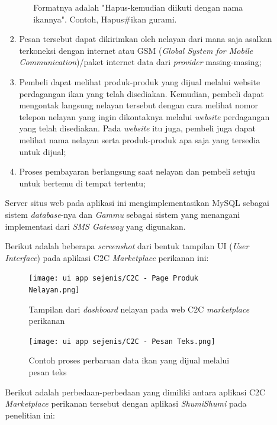 \documentclass[a4paper]{article}
\begin{document}
\begin{itemize}
\begin{enumerate}
\begin{enumerate}
\begin{itemize}
                Formatnya adalah "Hapus-kemudian diikuti dengan nama ikannya". Contoh, Hapus\#ikan gurami.
            \end{itemize}
    
            \item Pesan tersebut dapat dikirimkan oleh nelayan dari mana saja asalkan terkoneksi dengan internet atau GSM (\textit{Global System for Mobile Communication})/paket internet data dari \textit{provider} masing-masing\autocite{c2c-fish-marketplace};
            \item Pembeli dapat melihat produk-produk yang dijual melalui website perdagangan ikan yang telah disediakan. Kemudian, pembeli dapat mengontak langsung nelayan tersebut dengan cara melihat nomor telepon nelayan yang ingin dikontaknya melalui \textit{website} perdagangan yang telah disediakan. Pada \textit{website} itu juga, pembeli juga dapat melihat nama nelayan serta produk-produk apa saja yang tersedia untuk dijual\autocite{c2c-fish-marketplace};
            \item Proses pembayaran berlangsung saat nelayan dan pembeli setuju untuk bertemu di tempat tertentu\autocite{c2c-fish-marketplace};
    
        \end{enumerate}
    
        Server situs web pada aplikasi ini mengimplementasikan MySQL sebagai sistem \textit{database}-nya dan \textit{Gammu} sebagai sistem yang menangani implementasi dari \textit{SMS Gateway} yang digunakan\autocite{c2c-fish-marketplace}.
    
        \newpage
        Berikut adalah beberapa \textit{screenshot} dari bentuk tampilan UI (\textit{User Interface}) pada aplikasi C2C \textit{Marketplace} perikanan ini:
    
        \begin{figure}[h]
            \centering
            \texttt{[image: ui app sejenis/C2C - Page Produk Nelayan.png]}
            \caption{Tampilan dari \textit{dashboard} nelayan pada web C2C \textit{marketplace} perikanan}
        \end{figure}
    
        \begin{figure}[h]
            \centering
            \texttt{[image: ui app sejenis/C2C - Pesan Teks.png]}
            \caption{Contoh proses perbaruan data ikan yang dijual melalui pesan teks}
        \end{figure}
    
        Berikut adalah perbedaan-perbedaan yang dimiliki antara aplikasi C2C \textit{Marketplace} perikanan tersebut dengan aplikasi \textit{ShumiShumi} pada penelitian ini:
    

\end{enumerate}
\end{itemize}
\end{document}
